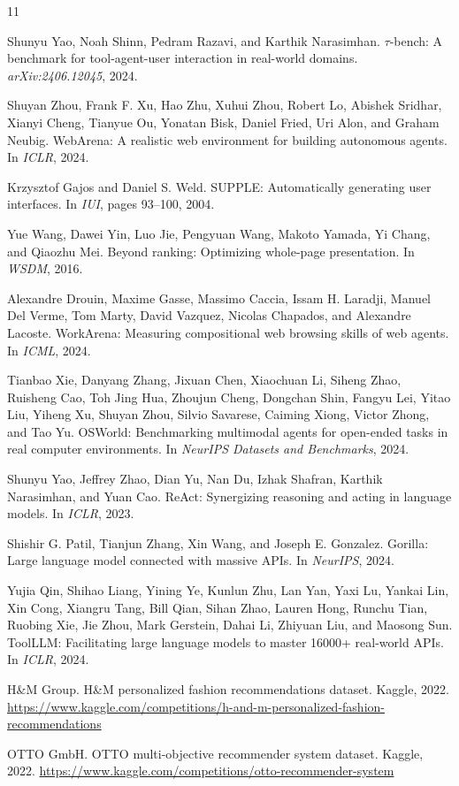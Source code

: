 \documentclass[sigconf, screen, review]{acmart}
\begin{document}

\begin{thebibliography}{11}

Shunyu Yao, Noah Shinn, Pedram Razavi, and Karthik Narasimhan.
\newblock $\tau$-bench: A benchmark for tool-agent-user interaction in real-world domains.
\newblock \emph{arXiv:2406.12045}, 2024.

Shuyan Zhou, Frank F. Xu, Hao Zhu, Xuhui Zhou, Robert Lo, Abishek Sridhar, Xianyi Cheng, Tianyue Ou, Yonatan Bisk, Daniel Fried, Uri Alon, and Graham Neubig.
\newblock WebArena: A realistic web environment for building autonomous agents.
\newblock In \emph{ICLR}, 2024.

Krzysztof Gajos and Daniel S. Weld.
\newblock SUPPLE: Automatically generating user interfaces.
\newblock In \emph{IUI}, pages 93--100, 2004.

Yue Wang, Dawei Yin, Luo Jie, Pengyuan Wang, Makoto Yamada, Yi Chang, and Qiaozhu Mei.
\newblock Beyond ranking: Optimizing whole-page presentation.
\newblock In \emph{WSDM}, 2016.

Alexandre Drouin, Maxime Gasse, Massimo Caccia, Issam H. Laradji, Manuel Del Verme, Tom Marty, David Vazquez, Nicolas Chapados, and Alexandre Lacoste.
\newblock WorkArena: Measuring compositional web browsing skills of web agents.
\newblock In \emph{ICML}, 2024.

Tianbao Xie, Danyang Zhang, Jixuan Chen, Xiaochuan Li, Siheng Zhao, Ruisheng Cao, Toh Jing Hua, Zhoujun Cheng, Dongchan Shin, Fangyu Lei, Yitao Liu, Yiheng Xu, Shuyan Zhou, Silvio Savarese, Caiming Xiong, Victor Zhong, and Tao Yu.
\newblock OSWorld: Benchmarking multimodal agents for open-ended tasks in real computer environments.
\newblock In \emph{NeurIPS Datasets and Benchmarks}, 2024.

Shunyu Yao, Jeffrey Zhao, Dian Yu, Nan Du, Izhak Shafran, Karthik Narasimhan, and Yuan Cao.
\newblock ReAct: Synergizing reasoning and acting in language models.
\newblock In \emph{ICLR}, 2023.

Shishir G. Patil, Tianjun Zhang, Xin Wang, and Joseph E. Gonzalez.
\newblock Gorilla: Large language model connected with massive APIs.
\newblock In \emph{NeurIPS}, 2024.

Yujia Qin, Shihao Liang, Yining Ye, Kunlun Zhu, Lan Yan, Yaxi Lu, Yankai Lin, Xin Cong, Xiangru Tang, Bill Qian, Sihan Zhao, Lauren Hong, Runchu Tian, Ruobing Xie, Jie Zhou, Mark Gerstein, Dahai Li, Zhiyuan Liu, and Maosong Sun.
\newblock ToolLLM: Facilitating large language models to master 16000+ real-world APIs.
\newblock In \emph{ICLR}, 2024.

H\&M Group.
\newblock H\&M personalized fashion recommendations dataset.
\newblock Kaggle, 2022. \url{https://www.kaggle.com/competitions/h-and-m-personalized-fashion-recommendations}

OTTO GmbH.
\newblock OTTO multi-objective recommender system dataset.
\newblock Kaggle, 2022. \url{https://www.kaggle.com/competitions/otto-recommender-system}

\end{thebibliography}
\end{document}
